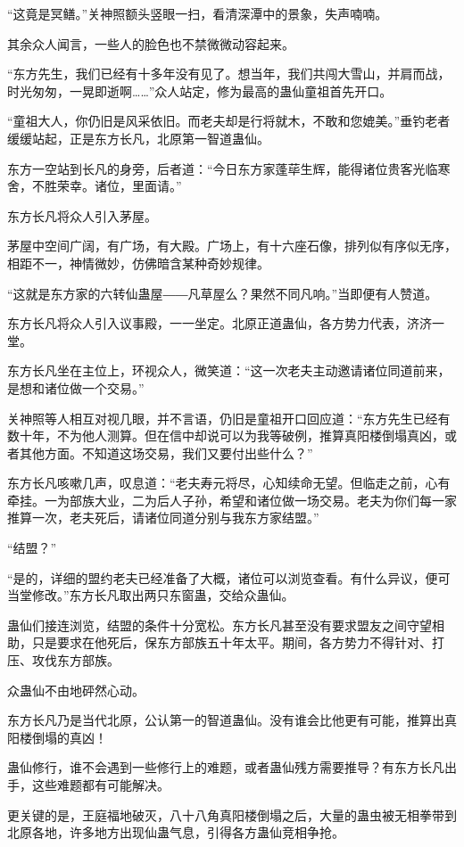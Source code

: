 \begin{this_body}
“这竟是冥鳝。”关神照额头竖眼一扫，看清深潭中的景象，失声喃喃。

其余众人闻言，一些人的脸色也不禁微微动容起来。

“东方先生，我们已经有十多年没有见了。想当年，我们共闯大雪山，并肩而战，时光匆匆，一晃即逝啊……”众人站定，修为最高的蛊仙童祖首先开口。

“童祖大人，你仍旧是风采依旧。而老夫却是行将就木，不敢和您媲美。”垂钓老者缓缓站起，正是东方长凡，北原第一智道蛊仙。

东方一空站到长凡的身旁，后者道：“今日东方家蓬荜生辉，能得诸位贵客光临寒舍，不胜荣幸。诸位，里面请。”

东方长凡将众人引入茅屋。

茅屋中空间广阔，有广场，有大殿。广场上，有十六座石像，排列似有序似无序，相距不一，神情微妙，仿佛暗含某种奇妙规律。

“这就是东方家的六转仙蛊屋――凡草屋么？果然不同凡响。”当即便有人赞道。

东方长凡将众人引入议事殿，一一坐定。北原正道蛊仙，各方势力代表，济济一堂。

东方长凡坐在主位上，环视众人，微笑道：“这一次老夫主动邀请诸位同道前来，是想和诸位做一个交易。”

关神照等人相互对视几眼，并不言语，仍旧是童祖开口回应道：“东方先生已经有数十年，不为他人测算。但在信中却说可以为我等破例，推算真阳楼倒塌真凶，或者其他方面。不知道这场交易，我们又要付出些什么？”

东方长凡咳嗽几声，叹息道：“老夫寿元将尽，心知续命无望。但临走之前，心有牵挂。一为部族大业，二为后人子孙，希望和诸位做一场交易。老夫为你们每一家推算一次，老夫死后，请诸位同道分别与我东方家结盟。”

“结盟？”

“是的，详细的盟约老夫已经准备了大概，诸位可以浏览查看。有什么异议，便可当堂修改。”东方长凡取出两只东窗蛊，交给众蛊仙。

蛊仙们接连浏览，结盟的条件十分宽松。东方长凡甚至没有要求盟友之间守望相助，只是要求在他死后，保东方部族五十年太平。期间，各方势力不得针对、打压、攻伐东方部族。

众蛊仙不由地砰然心动。

东方长凡乃是当代北原，公认第一的智道蛊仙。没有谁会比他更有可能，推算出真阳楼倒塌的真凶！

蛊仙修行，谁不会遇到一些修行上的难题，或者蛊仙残方需要推导？有东方长凡出手，这些难题都有可能解决。

更关键的是，王庭福地破灭，八十八角真阳楼倒塌之后，大量的蛊虫被无相拳带到北原各地，许多地方出现仙蛊气息，引得各方蛊仙竞相争抢。


\end{this_body}
